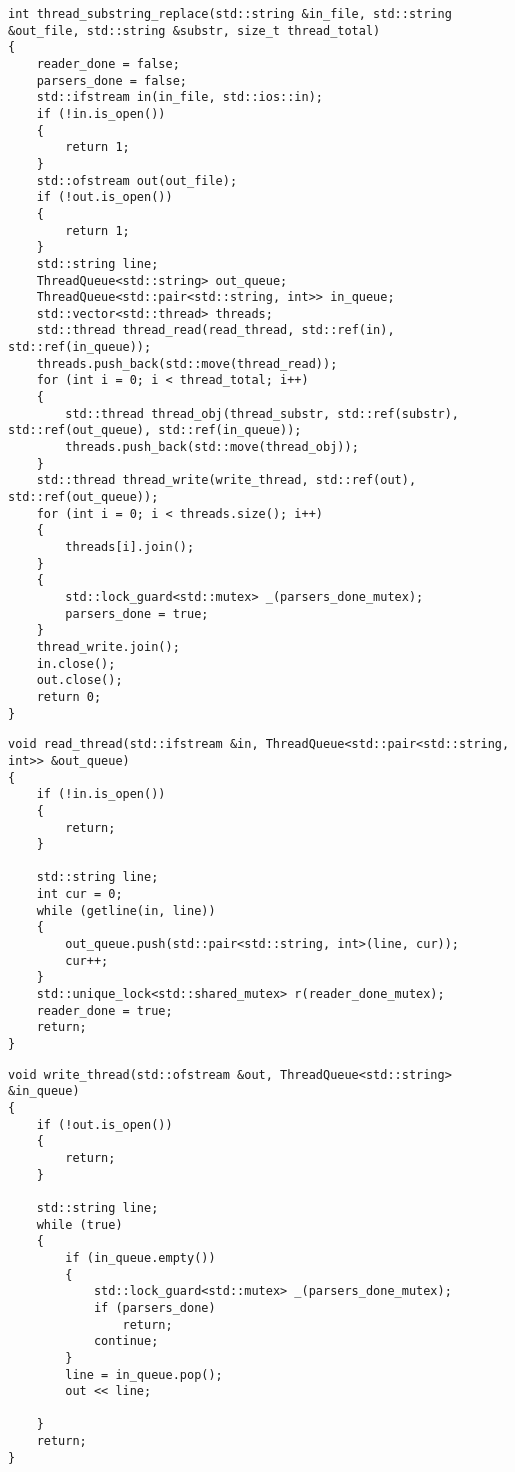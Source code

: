 \begin{lstlisting}[label=lst:main_thread,caption=Функция работы основного потока при многопоточной реализации]
int thread_substring_replace(std::string &in_file, std::string &out_file, std::string &substr, size_t thread_total)
{
	reader_done = false;
	parsers_done = false;
	std::ifstream in(in_file, std::ios::in);
	if (!in.is_open())
	{
		return 1;
	}
	std::ofstream out(out_file);
	if (!out.is_open())
	{
		return 1;
	}
	std::string line;
	ThreadQueue<std::string> out_queue;
	ThreadQueue<std::pair<std::string, int>> in_queue;
	std::vector<std::thread> threads;
	std::thread thread_read(read_thread, std::ref(in), std::ref(in_queue));
	threads.push_back(std::move(thread_read));
	for (int i = 0; i < thread_total; i++)
	{
		std::thread thread_obj(thread_substr, std::ref(substr), std::ref(out_queue), std::ref(in_queue));
		threads.push_back(std::move(thread_obj));
	}
	std::thread thread_write(write_thread, std::ref(out), std::ref(out_queue));
	for (int i = 0; i < threads.size(); i++)
	{
		threads[i].join();
	}
	{
		std::lock_guard<std::mutex> _(parsers_done_mutex);
		parsers_done = true;
	}
	thread_write.join();
	in.close();
	out.close();
	return 0;
}
\end{lstlisting}

\begin{lstlisting}[label=lst:read,caption=Функция работы потока-читателя]
void read_thread(std::ifstream &in, ThreadQueue<std::pair<std::string, int>> &out_queue)
{
	if (!in.is_open())
	{
		return;
	}

	std::string line;
	int cur = 0;
	while (getline(in, line))
	{
		out_queue.push(std::pair<std::string, int>(line, cur));
		cur++;
	}
	std::unique_lock<std::shared_mutex> r(reader_done_mutex);
	reader_done = true;
	return;
}
\end{lstlisting}

\begin{lstlisting}[label=lst:write,caption=Функция работы потока-писателя]
void write_thread(std::ofstream &out, ThreadQueue<std::string> &in_queue)
{
	if (!out.is_open())
	{
		return;
	}

	std::string line;
	while (true)
	{
		if (in_queue.empty())
		{
			std::lock_guard<std::mutex> _(parsers_done_mutex);
			if (parsers_done)
				return;
			continue;
		}
		line = in_queue.pop();
		out << line;

	}
	return;
}
\end{lstlisting}

